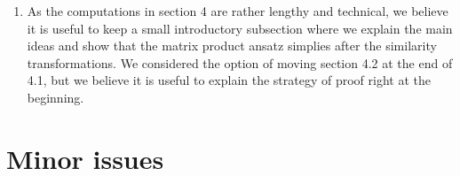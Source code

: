 \documentclass[10pt]{article}
\numberwithin{equation}{section}
\numberwithin{equation}{subsection}
\begin{document}
\begin{enumerate}
						\item 	As the computations in section 4 are rather lengthy and technical, we believe it is useful to keep a small introductory subsection where we explain the main ideas and show that the matrix product ansatz simplies after the similarity transformations.
							We considered the option of moving section 4.2 at the end of 4.1, but we believe it is useful to explain the strategy of proof right at the beginning.							
		\end{enumerate}
		\section*{Minor issues}
\end{document}
